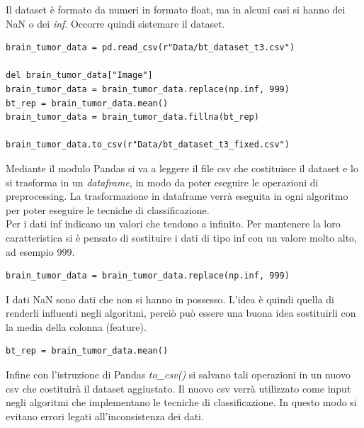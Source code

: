 Il dataset è formato da numeri in formato float, ma in alcuni casi si hanno dei NaN o dei \textit{inf}. Occorre quindi sistemare il dataset.\\
\begin{lstlisting}
brain_tumor_data = pd.read_csv(r"Data/bt_dataset_t3.csv")

del brain_tumor_data["Image"]
brain_tumor_data = brain_tumor_data.replace(np.inf, 999)
bt_rep = brain_tumor_data.mean()
brain_tumor_data = brain_tumor_data.fillna(bt_rep)

brain_tumor_data.to_csv(r"Data/bt_dataset_t3_fixed.csv")
\end{lstlisting}

Mediante il modulo Pandas si va a leggere il file csv che costituisce il dataset e lo si trasforma in un \textit{dataframe}, in modo da poter eseguire le operazioni di preprocessing. La trasformazione in dataframe verrà eseguita in ogni algoritmo per poter eseguire le tecniche di classificazione.\\
Per i dati inf indicano un valori che tendono a infinito. Per mantenere la loro caratteristica si è pensato di sostituire i dati di tipo inf con un valore molto alto, ad esempio 999.
\begin{lstlisting}
brain_tumor_data = brain_tumor_data.replace(np.inf, 999)
\end{lstlisting}
I dati NaN sono dati che non si hanno in possesso. L'idea è quindi quella di renderli influenti negli algoritmi, perciò può essere una buona idea sostituirli con la media della colonna (feature).
\begin{lstlisting}
bt_rep = brain_tumor_data.mean()
\end{lstlisting}
Infine con l'istruzione di Pandas \textit{to\_csv()} si salvano tali operazioni in un nuovo csv che costituirà il dataset aggiustato. Il nuovo csv verrà utilizzato come input negli algoritmi che implementano le tecniche di classificazione. In questo modo si evitano errori legati all'inconsistenza dei dati.

